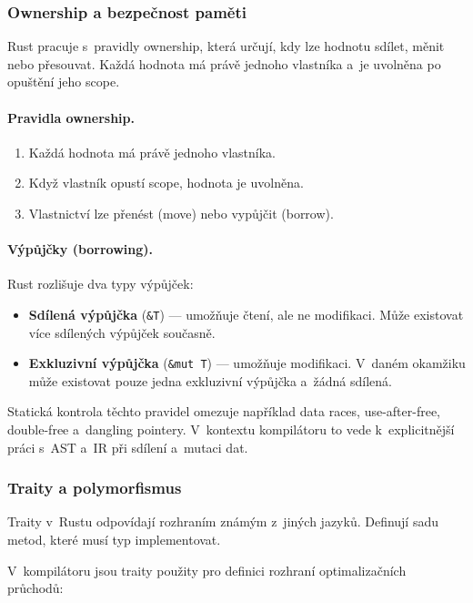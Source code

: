 \subsubsection{Ownership a bezpečnost paměti}
\label{sec:rust-ownership}

Rust pracuje s~pravidly ownership, která určují, kdy lze hodnotu sdílet,
měnit nebo přesouvat. Každá hodnota má právě jednoho vlastníka a~je
uvolněna po opuštění jeho scope.

\paragraph{Pravidla ownership.}
\begin{enumerate}
	\item Každá hodnota má právě jednoho vlastníka.
	\item Když vlastník opustí scope, hodnota je uvolněna.
	\item Vlastnictví lze přenést (move) nebo vypůjčit (borrow).
\end{enumerate}

\paragraph{Výpůjčky (borrowing).}
Rust rozlišuje dva typy výpůjček:
\begin{itemize}
	\item \textbf{Sdílená výpůjčka} (\texttt{\&T}) --- umožňuje čtení,
	      ale ne modifikaci. Může existovat více sdílených výpůjček současně.
	\item \textbf{Exkluzivní výpůjčka} (\texttt{\&mut T}) --- umožňuje
	      modifikaci. V~daném okamžiku může existovat pouze jedna exkluzivní
	      výpůjčka a~žádná sdílená.
\end{itemize}

Statická kontrola těchto pravidel omezuje například data races,
use-after-free, double-free a~dangling pointery. V~kontextu kompilátoru
to vede k~explicitnější práci s~AST a~IR při sdílení a~mutaci dat.


\subsubsection{Traity a polymorfismus}
\label{sec:rust-traits}

Traity v~Rustu odpovídají rozhraním známým z~jiných jazyků. Definují sadu
metod, které musí typ implementovat.

V~kompilátoru \Roth{} jsou traity použity pro definici rozhraní
optimalizačních průchodů:

